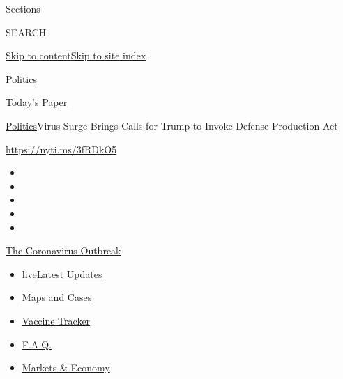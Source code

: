 Sections

SEARCH

\protect\hyperlink{site-content}{Skip to
content}\protect\hyperlink{site-index}{Skip to site index}

\href{https://www.nytimes.com/section/politics}{Politics}

\href{https://myaccount.nytimes.com/auth/login?response_type=cookie\&client_id=vi}{}

\href{https://www.nytimes.com/section/todayspaper}{Today's Paper}

\href{/section/politics}{Politics}\textbar{}Virus Surge Brings Calls for
Trump to Invoke Defense Production Act

\href{https://nyti.ms/3fRDkO5}{https://nyti.ms/3fRDkO5}

\begin{itemize}
\item
\item
\item
\item
\item
\end{itemize}

\href{https://www.nytimes.com/news-event/coronavirus?action=click\&pgtype=Article\&state=default\&region=TOP_BANNER\&context=storylines_menu}{The
Coronavirus Outbreak}

\begin{itemize}
\tightlist
\item
  live\href{https://www.nytimes.com/2020/08/08/world/coronavirus-updates.html?action=click\&pgtype=Article\&state=default\&region=TOP_BANNER\&context=storylines_menu}{Latest
  Updates}
\item
  \href{https://www.nytimes.com/interactive/2020/us/coronavirus-us-cases.html?action=click\&pgtype=Article\&state=default\&region=TOP_BANNER\&context=storylines_menu}{Maps
  and Cases}
\item
  \href{https://www.nytimes.com/interactive/2020/science/coronavirus-vaccine-tracker.html?action=click\&pgtype=Article\&state=default\&region=TOP_BANNER\&context=storylines_menu}{Vaccine
  Tracker}
\item
  \href{https://www.nytimes.com/interactive/2020/world/coronavirus-tips-advice.html?action=click\&pgtype=Article\&state=default\&region=TOP_BANNER\&context=storylines_menu}{F.A.Q.}
\item
  \href{https://www.nytimes.com/live/2020/08/07/business/stock-market-today-coronavirus?action=click\&pgtype=Article\&state=default\&region=TOP_BANNER\&context=storylines_menu}{Markets
  \& Economy}
\end{itemize}

